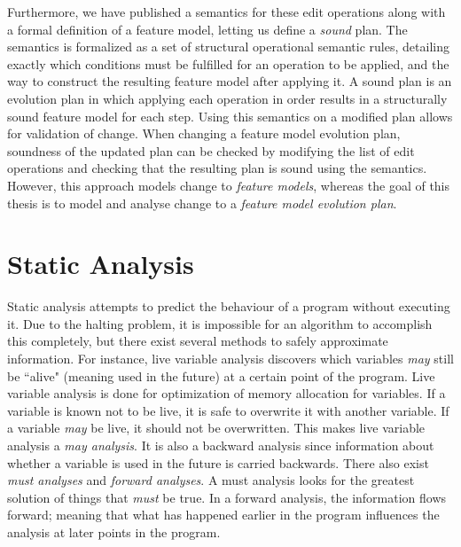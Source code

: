 Furthermore, we have published a semantics for these edit operations along with a formal definition of a feature model, letting us define a \emph{sound} plan. The semantics is formalized as a set of structural operational semantic rules, detailing exactly which conditions must be fulfilled for an operation to be applied, and the way to construct the resulting feature model after applying it. A sound plan is an evolution plan in which applying each operation in order results in a structurally sound feature model for each step. Using this semantics on a modified plan allows for validation of change. When changing a feature model evolution plan, soundness of the updated plan can be checked by modifying the list of edit operations and checking that the resulting plan is sound using the semantics. However, this approach models change to \emph{feature models}, whereas the goal of this thesis is to model and analyse change to a \emph{feature model evolution plan}.

\section{Static Analysis}
\label{sec:static-analysis}

Static analysis attempts to predict the behaviour of a program without executing it. Due to the halting problem, it is impossible for an algorithm to accomplish this completely, but there exist several methods to safely approximate information. For instance, live variable analysis discovers which variables \emph{may} still be ``alive" (meaning used in the future) at a certain point of the program. Live variable analysis is done for optimization of memory allocation for variables. If a variable is known not to be live, it is safe to overwrite it with another variable. If a variable \emph{may} be live, it should not be overwritten. This makes live variable analysis a \emph{may analysis}. It is also a backward analysis since information about whether a variable is used in the future is carried backwards. There also exist \emph{must analyses} and \emph{forward analyses}. A must analysis looks for the greatest solution of things that \emph{must} be true. In a forward analysis, the information flows forward; meaning that what has happened earlier in the program influences the analysis at later points in the program.

